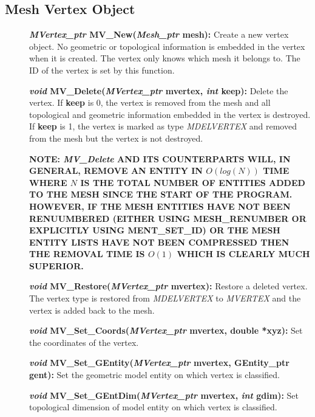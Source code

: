\documentclass[12pt]{article}
\begin{document}
\newpage
\subsection{Mesh Vertex Object}

\begin{description}
\item[]{\bf {\em MVertex\_ptr} MV\_New({\em Mesh\_ptr}
    mesh):} Create a new vertex object. No geometric or topological
  information is embedded in the vertex when it is created. The vertex
  only knows which mesh it belongs to. The ID of the vertex is set by
  this function.
  
\item[]{\bf {\em void} MV\_Delete({\em MVertex\_ptr} mvertex,
    {\em int} keep):} Delete the vertex. If {\bf keep} is 0, the
  vertex is removed from the mesh and all topological and geometric
  information embedded in the vertex is destroyed. If {\bf keep} is
  1, the vertex is marked as type {\em MDELVERTEX} and removed from
  the mesh but the vertex is not destroyed.


  \par {\bf NOTE: {\em MV\_Delete} AND ITS COUNTERPARTS WILL, IN GENERAL,
    REMOVE AN ENTITY IN $O(log(N))$ TIME WHERE $N$ IS THE TOTAL NUMBER
    OF ENTITIES ADDED TO THE MESH SINCE THE START OF THE
    PROGRAM. HOWEVER, IF THE MESH ENTITIES HAVE NOT BEEN RENUUMBERED
    (EITHER USING MESH\_RENUMBER OR EXPLICITLY USING MENT\_SET\_ID) OR
    THE MESH ENTITY LISTS HAVE NOT BEEN COMPRESSED THEN THE REMOVAL
    TIME IS $O(1)$ WHICH IS CLEARLY MUCH SUPERIOR.}


\item[]{\bf {\em void} MV\_Restore({\em MVertex\_ptr}
    mvertex):} Restore a deleted vertex. The vertex type is restored
  from {\em MDELVERTEX} to {\em MVERTEX} and the vertex is
  added back to the mesh.

\item[]
  
\item[]{\bf {\em void} MV\_Set\_Coords({\em MVertex\_ptr}
    mvertex, double *xyz):} Set the coordinates of the vertex.
    
\item[]{\bf {\em void} MV\_Set\_GEntity({\em MVertex\_ptr}
    mvertex, GEntity\_ptr gent):} Set the geometric model entity on
  which vertex is classified.


\item[]{\bf {\em void} MV\_Set\_GEntDim({\em MVertex\_ptr} mvertex,
{\em int} gdim):} Set topological dimension of model entity on which
vertex is classified.


\end{description}
\end{document}

